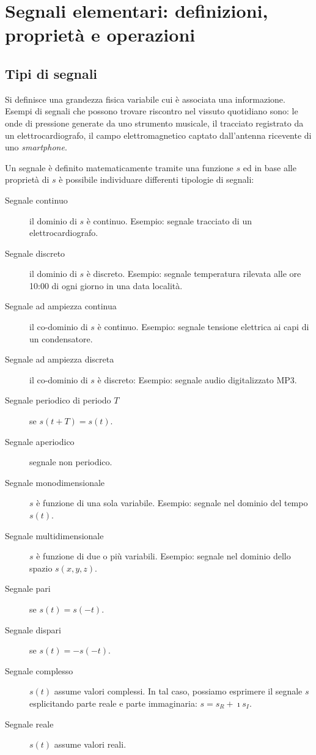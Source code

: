 \chapter{Segnali elementari: definizioni, proprietà e operazioni}\label{ch:Capitolo1}
\section{Tipi di segnali}
Si definisce  una grandezza fisica variabile cui è associata una informazione. Esempi di segnali che possono trovare riscontro nel vissuto quotidiano sono: le onde di pressione generate da uno strumento musicale, il tracciato registrato da un elettrocardiografo, il campo elettromagnetico captato dall'antenna ricevente di uno \emph{smartphone}.

Un segnale è definito matematicamente tramite una funzione $s$ ed in base alle proprietà di $s$ è possibile individuare differenti tipologie di segnali:
\begin{description}
	\item[Segnale continuo] il dominio di $s$ è continuo. Esempio: segnale tracciato di un elettrocardiografo.
	\item[Segnale discreto] il dominio di $s$ è discreto. Esempio: segnale temperatura rilevata alle ore 10:00 di ogni giorno in una data località.
	\item[Segnale ad ampiezza continua] il co-dominio di $s$ è continuo. Esempio: segnale tensione elettrica ai capi di un condensatore.
	\item[Segnale ad ampiezza discreta] il co-dominio di $s$ è discreto: Esempio: segnale audio digitalizzato MP3.
	\item[Segnale periodico di periodo $T$] se $s(t+T)=s(t)$.
	\item[Segnale aperiodico] segnale non periodico.
	\item[Segnale monodimensionale] $s$ è funzione di una sola variabile. Esempio: segnale nel dominio del tempo $s(t)$.
	\item[Segnale multidimensionale] $s$ è funzione di due o più variabili. Esempio: segnale nel dominio dello spazio $s(x,y,z)$.
	\item[Segnale pari] se $s(t)=s(-t)$.
	\item[Segnale dispari] se $s(t)=-s(-t)$.
	\item[Segnale complesso] $s(t)$ assume valori complessi. In tal caso, possiamo esprimere il segnale $s$ esplicitando parte reale e parte immaginaria: $s=s_R+\imath s_I$.
	\item[Segnale reale] $s(t)$ assume valori reali.
\end{description}

